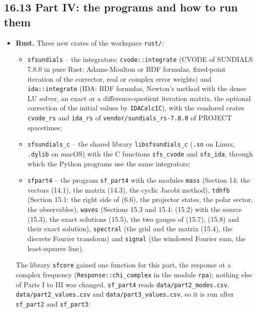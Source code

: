 \documentclass[
  10pt,
]{article}
\providecommand{\tightlist}{%
  \setlength{\itemsep}{0pt}\setlength{\parskip}{0pt}}
\begin{document}
\hypertarget{part-iv-the-programs-and-how-to-run-them}{%
\subsection{16.13 Part IV: the programs and how to run
them}\label{part-iv-the-programs-and-how-to-run-them}}

\begin{itemize}
\item
  \textbf{Rust.} Three new crates of the workspace \texttt{rust/}:

  \begin{itemize}
  \tightlist
  \item
    \texttt{sfsundials} -- the integrators: \texttt{cvode::integrate}
    (CVODE of SUNDIALS 7.8.0 in pure Rust: Adams-Moulton or BDF
    formulas, fixed-point iteration of the corrector, real or complex
    error weights) and \texttt{ida::integrate} (IDA: BDF formulas,
    Newton's method with the dense LU solver, an exact or a
    difference-quotient iteration matrix, the optional correction of the
    initial values by \texttt{IDACalcIC}), with the vendored crates
    \texttt{cvode\_rs} and \texttt{ida\_rs} of
    \texttt{vendor/sundials\_rs-7.8.0} of PROJECT spacetimes;
  \item
    \texttt{sfsundials\_c} -- the shared library
    \texttt{libsfsundials\_c} (\texttt{.so} on Linux, \texttt{.dylib} on
    macOS) with the C functions \texttt{sfs\_cvode} and
    \texttt{sfs\_ida}, through which the Python programs use the same
    integrators;
  \item
    \texttt{sfpart4} -- the program \texttt{sf\_part4} with the modules
    \texttt{mass} (Section 14: the vectors (14.1), the matrix (14.3),
    the cyclic Jacobi method), \texttt{tdhfb} (Section 15.1: the right
    side of (6.6), the projector states, the polar sector, the
    observables), \texttt{waves} (Sections 15.3 and 15.4: (15.2) with
    the source (15.3), the exact solutions (15.5), the two gauges of
    (15.7), (15.8) and their exact solution), \texttt{spectral} (the
    grid and the matrix (15.4), the discrete Fourier transform) and
    \texttt{signal} (the windowed Fourier sum, the least-squares line).
  \end{itemize}

  The library \texttt{sfcore} gained one function for this part, the
  response at a complex frequency (\texttt{Response::chi\_complex} in
  the module \texttt{rpa}); nothing else of Parts I to III was changed.
  \texttt{sf\_part4} reads \texttt{data/part2\_modes.csv},
  \texttt{data/part2\_values.csv} and \texttt{data/part3\_values.csv},
  so it is run after \texttt{sf\_part2} and \texttt{sf\_part3}:


\end{itemize}
\end{document}
